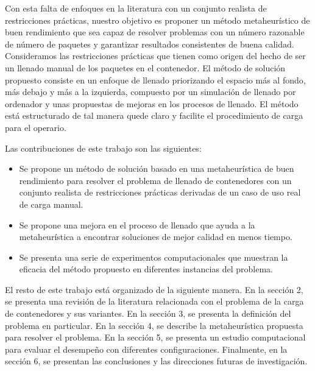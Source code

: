 \documentclass[openany]{article}
\begin{document}
Con esta falta de enfoques en la literatura con un conjunto realista de restricciones prácticas, nuestro objetivo es proponer un método metaheurístico de buen rendimiento que sea capaz de resolver problemas con un número razonable de número de paquetes y garantizar resultados consistentes de buena calidad. Consideramos las restricciones prácticas que tienen como origen del hecho de ser un llenado manual de los paquetes en el contenedor. El método de solución propuesto consiste en un enfoque de llenado priorizando el espacio más al fondo, más debajo y más a la izquierda, compuesto por un simulación de llenado por ordenador y unas propuestas de mejoras en los procesos de llenado. El método está estructurado de tal manera quede claro y facilite el procedimiento de carga para el operario.

Las contribuciones de este trabajo son las siguientes:

\begin{itemize}
    \item Se propone un método de solución basado en una metaheurística de buen rendimiento para resolver el problema de llenado de contenedores con un conjunto realista de restricciones prácticas derivadas de un caso de uso real de carga manual.
    \item Se propone una mejora en el proceso de llenado que ayuda a la metaheurística a encontrar soluciones de mejor calidad en menos tiempo.
    \item Se presenta una serie de experimentos computacionales que muestran la eficacia del método propuesto en diferentes instancias del problema.
\end{itemize}

El resto de este trabajo está organizado de la siguiente manera. En la sección 2, se presenta una revisión de la literatura relacionada con el problema de la carga de contenedores y sus variantes. En la sección 3, se presenta la definición del problema en particular. En la sección 4, se describe la metaheurística propuesta para resolver el problema. En la sección 5, se presenta un estudio computacional para evaluar el desempeño con diferentes configuraciones. Finalmente, en la sección 6, se presentan las conclusiones y las direcciones futuras de investigación.





\newpage






\end{document}
